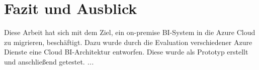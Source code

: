 \chapter{Fazit und Ausblick} \label{ch:zusammenfassung}
Diese Arbeit hat sich mit dem Ziel, ein on-premise BI-System in die Azure Cloud zu migrieren, beschäftigt. Dazu wurde durch die Evaluation verschiedener Azure Dienste eine Cloud BI-Architektur entworfen. Diese wurde als Prototyp erstellt und anschließend getestet.
\textit{...}